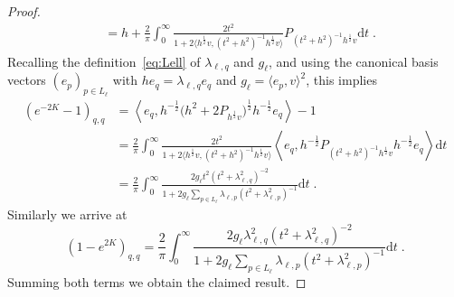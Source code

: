 \documentclass[12pt,a4paper]{article}
\numberwithin{equation}{section}
\newcommand{\1}{\mathbb{I}}
\newcommand{\Zstar}{\mathbb{Z}^3} %
\newcommand{\Z}{\mathbb{Z}}
\newcommand{\half}{\frac{1}{2}}
\newcommand{\eva}[1]{\left\langle #1 \right\rangle}
\theoremstyle{plain}
\theoremstyle{definition}
\theoremstyle{remark}
\theoremstyle{plain}
\theoremstyle{definition}
\theoremstyle{remark}
\begin{document}
\begin{proof}
\begin{align}
	&= h + \frac{2}{\pi} \int_0^\infty \frac{2t^2}{1+ 2 \big\langle h^{\half} v ,(t^2+h^2)^{-1} h^\half v \big\rangle }  P_{(t^2+h^2)^{-1}h^{\half} v}\mathrm{d}t \;.
\end{align}
Recalling the definition~\eqref{eq:Lell} of $ \lambda_{\ell,q} $ and $ g_\ell $, and using the canonical basis vectors $ (e_p)_{p \in L_\ell} $ with $ h e_q = \lambda_{\ell,q} e_q $ and $ g_\ell = \langle e_p,v \rangle^2 $, this implies
\begin{align}
	(e^{-2K}-1)_{q,q}
	&= \eva{e_q, h^{-\half} \big(h^2 +2P_{h^{\half} v}\big)^{\half} h^{-\half} e_q} - 1\nonumber\\
	&= \frac{2}{\pi} \int_0^\infty \frac{2t^2}{1+ 2 \big\langle h^{\half} v ,(t^2+h^2)^{-1} h^\half v \big\rangle } \eva{e_q,h^{-\half} P_{(t^2+h^2)^{-1}h^{\half} v}h^{-\half} e_q}\mathrm{d}t\nonumber\\
	&= \frac{2}{\pi} \int_0^\infty \frac{2g_\ell t^2 (t^2+\lambda^2_{\ell,q})^{-2}}{1+ 2g_\ell\sum_{p \in L_\ell}\lambda_{\ell,p}(t^2+\lambda^2_{\ell,p})^{-1} } \mathrm{d}t \;. \label{eq:e-2k_integral}
\end{align}
Similarly we arrive at
\begin{equation} \label{eq:e2kfin}
	(1-e^{2K})_{q,q}
	= \frac{2}{\pi} \int_0^\infty \frac{2g_\ell \lambda_{\ell,q}^2 (t^2+\lambda^2_{\ell,q})^{-2}}{1+ 2g_\ell\sum_{p \in L_{\ell}}\lambda_{\ell,p}(t^2+\lambda^2_{\ell,p})^{-1} } \mathrm{d}t \;.
\end{equation}
Summing both terms we obtain the claimed result.
\end{proof}
\end{document}
